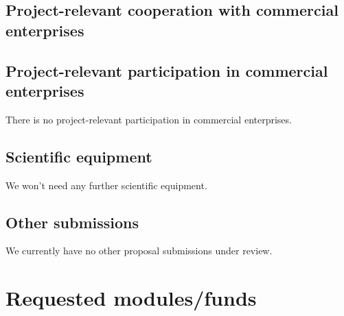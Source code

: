 \documentclass{scrartcl}
\begin{document}
\subsection{Project-relevant cooperation with commercial enterprises}



\subsection{Project-relevant participation in commercial enterprises}

There is no project-relevant participation in commercial enterprises.  

\subsection{Scientific equipment}

We won't need any further scientific equipment. 

\subsection{Other submissions}

We currently have no other proposal submissions under review.  

\section{Requested modules/funds}
\end{document}
